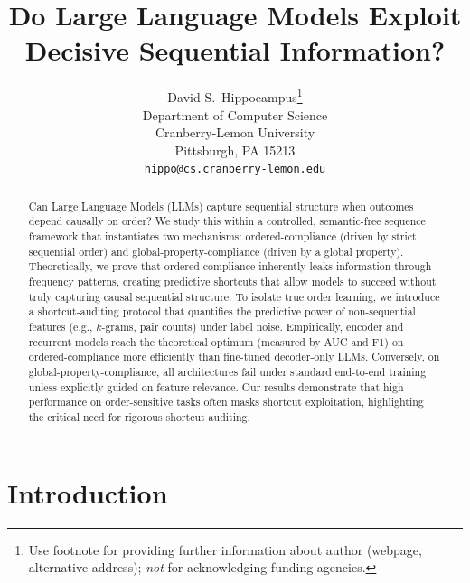 \documentclass{article}
\title{Do Large Language Models Exploit Decisive Sequential Information?}
\author{%
  David S.~Hippocampus\thanks{Use footnote for providing further information
    about author (webpage, alternative address); \emph{not} for acknowledging
    funding agencies.} \\
  Department of Computer Science\\
  Cranberry-Lemon University\\
  Pittsburgh, PA 15213 \\
  \texttt{hippo@cs.cranberry-lemon.edu} \\
}
\theoremstyle{plain}
\theoremstyle{definition}
\theoremstyle{remark}
\begin{document}
\maketitle
\begin{abstract}
Can Large Language Models (LLMs) capture sequential structure when outcomes depend causally on order? We study this within a controlled, semantic-free sequence framework that instantiates two mechanisms: ordered-compliance (driven by strict sequential order) and global-property-compliance (driven by a global property). Theoretically, we prove that ordered-compliance inherently leaks information through frequency patterns, creating predictive shortcuts that allow models to succeed without truly capturing causal sequential structure. To isolate true order learning, we introduce a shortcut-auditing protocol that quantifies the predictive power of non-sequential features (e.g., $k$-grams, pair counts) under label noise. Empirically, encoder and recurrent models reach the theoretical optimum (measured by AUC and F1) on ordered-compliance more efficiently than fine-tuned decoder-only LLMs. Conversely, on global-property-compliance, all architectures fail under standard end-to-end training unless explicitly guided on feature relevance. Our results demonstrate that high performance on order-sensitive tasks often masks shortcut exploitation, highlighting the critical need for rigorous shortcut auditing.
\end{abstract}




\section{Introduction}
\label{sec:introduction}
\end{document}
